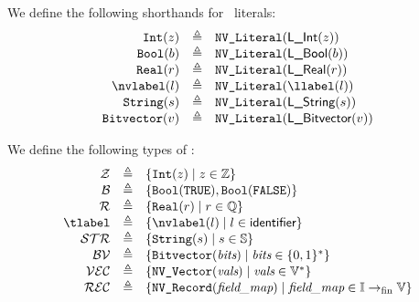 We define the following shorthands for \nativevalue\ literals:
\hypertarget{def-nvint}{}
\[
\begin{array}{rcl}
\nvint(z)       &\triangleq& \nvliteral{\lint(z)}           \hypertarget{def-nvbool}{}\\
\nvbool(b)      &\triangleq& \nvliteral{\lbool(b)}          \hypertarget{def-nvreal}{}\\
\nvreal(r)      &\triangleq& \nvliteral{\lreal(r)}          \hypertarget{def-nvlabel}{}\\
\nvlabel(l)     &\triangleq& \nvliteral{\llabel(l)}         \hypertarget{def-nvstring}{}\\
\nvstring(s)    &\triangleq& \nvliteral{\lstring(s)}        \hypertarget{def-nvbitvector}{}\\
\nvbitvector(v) &\triangleq& \nvliteral{\lbitvector(v)}\\
\end{array}
\]

We define the following types of \nativevalues:
\hypertarget{def-tint}{}
\[
\begin{array}{rcl}
  \tint       &\triangleq& \{ \nvint(z) \;|\; z \in \Z\}                                        \hypertarget{def-tbool}{}\\
  \tbool      &\triangleq& \{ \nvbool(\True), \nvbool(\False) \}                                \hypertarget{def-treal}{}\\
  \treal      &\triangleq& \{ \nvreal(r) \;|\; r \in \Q\}                                       \hypertarget{def-tstring}{}\\
  \tlabel     &\triangleq& \{ \nvlabel(l) \;|\; l \in \identifier\}                             \hypertarget{def-tlabel}{}\\
  \tstring    &\triangleq& \{ \nvstring(s) \;|\; s \in \Strings\}  \hypertarget{def-tbitvector}{}\\
  \tbitvector &\triangleq& \{ \nvbitvector(\textit{bits}) \;|\; \textit{bits} \in \{0,1\}^*\}   \hypertarget{def-tvector}{}\\
  \tvector    &\triangleq& \{ \nvvector{\textit{vals}} \;|\; \textit{vals} \in \vals^*\}        \hypertarget{def-trecord}{}\\
  \trecord  &\triangleq& \{ \nvrecord{\fieldmap} \;|\; \fieldmap \in \Identifiers\rightarrowfin\vals\}\\
\end{array}
\]

